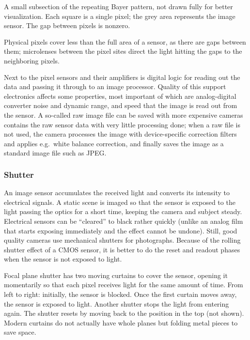 {A small subsection of the repeating Bayer pattern, not drawn fully for better visualization. Each square is a single pixel; the grey area represents the image sensor. The gap between pixels is nonzero.}


Physical pixels cover less than the full area of a sensor, as there are gaps between them;
microlenses between the pixel sites direct the light hitting the gaps to the neighboring pixels.


Next to the pixel sensors and their amplifiers is digital logic for reading out the data and passing it through to an image processor.
Quality of this support electronics affects some properties, most important of which are analog-digital converter noise and dynamic range, and speed that the image is read out from the sensor.
A so-called raw image file can be saved with more expensive cameras contains the raw sensor data with very little processing done;
when a raw file is not used, the camera processes the image with device-specific correction filters and applies e.g.~white balance correction, and finally saves the image as a standard image file such as JPEG.


\subsubsection{Shutter} %


An image sensor accumulates the received light and converts its intensity to electrical signals.
A static scene is imaged so that the sensor is exposed to the light passing the optics for a short time, keeping the camera and subject steady.
Electrical sensors can be ``cleared'' to black rather quickly (unlike an analog film that starts exposing immediately and the effect cannot be undone). Still, good quality cameras use mechanical shutters for photographs.
Because of the rolling shutter effect of a CMOS sensor, it is better to do the reset and readout phases when the sensor is not exposed to light.


{Focal plane shutter has two moving curtains to cover the sensor, opening it momentarily so that each pixel receives light for the same amount of time.
From left to right: initially, the sensor is blocked.
Once the first curtain moves away, the sensor is exposed to light.
Another shutter stops the light from entering again.
The shutter resets by moving back to the position in the top (not shown).
Modern curtains do not actually have whole planes but folding metal pieces to save space.
}

